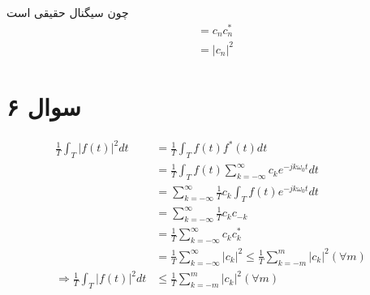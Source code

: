 \documentclass{article}
\begin{document}
	چون سیگنال حقیقی است
	\begin{align*}
		&= c_n c^{*}_n \\
		&= |c_n|^2
	\end{align*}

	\section*{سوال ۶}

	\begin{align*}
		\frac{1}{T} \int_{T}^{} |f(t)|^2 dt
		&= \frac{1}{T} \int_{T}^{} f(t)f^*(t) dt\\
		&= \frac{1}{T} \int_{T}^{} f(t) \sum_{k=-\infty}^{\infty} c_k e^{-jk\omega_0t} dt \\
		&= \sum_{k=-\infty}^{\infty} \frac{1}{T} c_k \int_{T}^{} f(t) e^{-jk\omega_0t} dt \\
		&= \sum_{k=-\infty}^{\infty} \frac{1}{T} c_k c_{-k} \\
		&= \frac{1}{T} \sum_{k=-\infty}^{\infty} c_k c^*_{k} \\
		&= \frac{1}{T} \sum_{k=-\infty}^{\infty} |c_k|^2
		\le \frac{1}{T} \sum_{k=-m}^{m} |c_k|^2 (\forall m) \\
		\Rightarrow
		\frac{1}{T} \int_{T}^{} |f(t)|^2 dt
		&\le \frac{1}{T} \sum_{k=-m}^{m} |c_k|^2 (\forall m)
	\end{align*}
\end{document}
